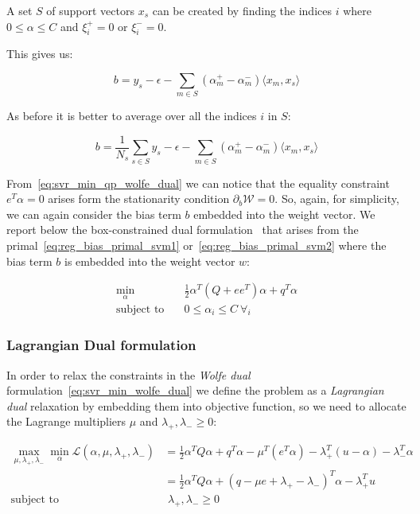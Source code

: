 A set $S$ of support vectors $x_s$ can be created by finding the indices $i$ where $0\leq\alpha\leq C$ and $\xi_i^+=0$ or $\xi_i^-=0$.

This gives us:

\begin{equation} \label{eq:svr_b}
    b=y_s-\epsilon-\sum_{m\in S}(\alpha_m^+ -\alpha_m^-) \langle x_m, x_s \rangle
\end{equation}

As before it is better to average over all the indices $i$ in $S$:

\begin{equation} \label{eq:svr_b_avg}
    b=\frac{1}{N_s}\sum_{s\in S}y_s-\epsilon-\sum_{m \in S}(\alpha_m^+ - \alpha_m^-)\langle x_m, x_s \rangle
\end{equation}

From~\eqref{eq:svr_min_qp_wolfe_dual} we can notice that the equality constraint $e^T \alpha = 0$ arises form the stationarity condition $\partial_{{b}} \mathcal{W}=0$. So, again, for simplicity, we can again consider the bias term $b$ embedded into the weight vector. We report below the box-constrained dual formulation~\cite{hsu2002simple} that arises from the primal~\eqref{eq:reg_bias_primal_svm1} or~\eqref{eq:reg_bias_primal_svm2} where the bias term $b$ is embedded into the weight vector $w$:

\begin{equation} \label{eq:svr_min_bcqp_wolf_dual}
    \begin{aligned}
        \min_{\alpha} \quad & \frac{1}{2} \alpha^T (Q + ee^T)\alpha+q^T\alpha \\
            \text{subject to} \quad & 0\leq\alpha_i\leq C \ \forall_i
    \end{aligned}
\end{equation}

\subsubsection{Lagrangian Dual formulation}

In order to relax the constraints in the \emph{Wolfe dual} formulation~\eqref{eq:svr_min_wolfe_dual} we define the problem as a \emph{Lagrangian dual} relaxation by embedding them into objective function, so we need to allocate the Lagrange multipliers $\mu$ and $\lambda_+, \lambda_- \geq 0$:

\begin{equation} \label{eq:svr_lagrangian_dual}
	\begin{aligned}
		    \max_{\mu,\lambda_+,\lambda_-} \min_{\alpha} \mathcal{L}(\alpha,\mu,\lambda_+,\lambda_-) &= \frac{1}{2} \alpha^T Q\alpha+q^T\alpha - \mu^T (e^T \alpha) - \lambda_+^T (u - \alpha) - \lambda_-^T \alpha \\
    &= \frac{1}{2} \alpha^T Q\alpha + (q - \mu e + \lambda_+ - \lambda_-)^T \alpha - \lambda_+^T u \\
    \text{subject to} \quad & \,\, \lambda_+, \lambda_- \geq 0
	\end{aligned}
\end{equation}


